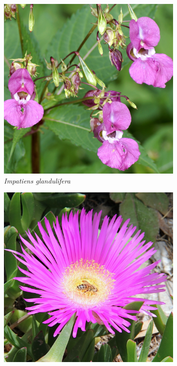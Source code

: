 \documentclass[a4paper,10pt]{article}
\begin{document}
\begin{figure}
    \centering
    \begin{subfigure}{0.3\textwidth}
        \centering
        \includegraphics[width=\textwidth]{Impatiens_glandulifera}
        \caption{\textit{Impatiens glandulifera}}
    \end{subfigure}
    \hfill
    \begin{subfigure}{0.3\textwidth}
        \centering
        \includegraphics[width=\textwidth]{Carpobrotus_acinaciformis}

\end{subfigure}
\end{figure}
\end{document}
